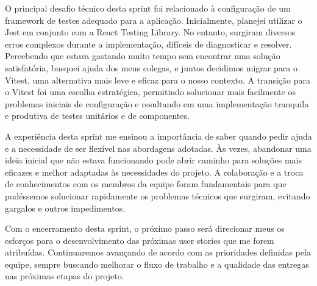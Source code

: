 O principal desafio técnico desta sprint foi relacionado à configuração de um framework de testes adequado para a aplicação. Inicialmente, planejei utilizar o Jest em conjunto com a React Testing Library. No entanto, surgiram diversos erros complexos durante a implementação, difíceis de diagnosticar e resolver. Percebendo que estava gastando muito tempo sem encontrar uma solução satisfatória, busquei ajuda dos meus colegas, e juntos decidimos migrar para o Vitest, uma alternativa mais leve e eficaz para o nosso contexto. A transição para o Vitest foi uma escolha estratégica, permitindo solucionar mais facilmente os problemas iniciais de configuração e resultando em uma implementação tranquila e produtiva de testes unitários e de componentes.

A experiência desta sprint me ensinou a importância de saber quando pedir ajuda e a necessidade de ser flexível nas abordagens adotadas. Às vezes, abandonar uma ideia inicial que não estava funcionando pode abrir caminho para soluções mais eficazes e melhor adaptadas às necessidades do projeto. A colaboração e a troca de conhecimentos com os membros da equipe foram fundamentais para que pudéssemos solucionar rapidamente os problemas técnicos que surgiram, evitando gargalos e outros impedimentos.

Com o encerramento desta sprint, o próximo passo será direcionar meus os esforços para o desenvolvimento das próximas user stories que me forem atribuídas. Continuaremos avançando de acordo com as prioridades definidas pela equipe, sempre buscando melhorar o fluxo de trabalho e a qualidade das entregas nas próximas etapas do projeto.